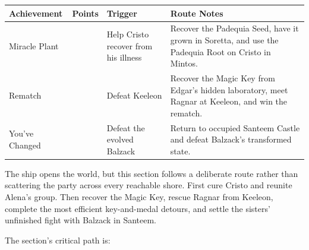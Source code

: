 \documentclass[
  american,
  10pt,
  letterpaper,
  oneside,
  open=any]{scrreprt}
\newcounter{none} %
\newenvironment{guidetable}{%
  \small\setstretch{1.0}%
  \setlength{\tabcolsep}{4pt}%
  \setlength{\LTpre}{8pt}\setlength{\LTpost}{10pt}%
  \renewcommand{\arraystretch}{1.16}%
}{ }
\begin{document}
\begin{guidetable}

{\def\LTcaptype{none} %
\begin{longtable}[]{@{}
  >{\raggedright\arraybackslash}p{}
  >{\raggedleft\arraybackslash}p{}
  >{\raggedright\arraybackslash}p{}
  >{\raggedright\arraybackslash}p{}@{}}
\toprule\noalign{}
\begin{minipage}[b]{\linewidth}\raggedright
\color{GuideGreen}\bfseries Achievement
\end{minipage} & \begin{minipage}[b]{\linewidth}\raggedleft
\color{GuideGreen}\bfseries Points
\end{minipage} & \begin{minipage}[b]{\linewidth}\raggedright
\color{GuideGreen}\bfseries Trigger
\end{minipage} & \begin{minipage}[b]{\linewidth}\raggedright
\color{GuideGreen}\bfseries Route Notes
\end{minipage} \\
\midrule\noalign{}
\endhead
\bottomrule\noalign{}
\endlastfoot
Miracle Plant & 5 & Help Cristo recover from his illness & Recover the
Padequia Seed, have it grown in Soretta, and use the Padequia Root on
Cristo in Mintos. \\
Rematch & 5 & Defeat Keeleon & Recover the Magic Key from Edgar's hidden
laboratory, meet Ragnar at Keeleon, and win the rematch. \\
You've Changed & 5 & Defeat the evolved Balzack & Return to occupied
Santeem Castle and defeat Balzack's transformed state. \\
\end{longtable}
}

\end{guidetable}

The ship opens the world, but this section follows a deliberate route
rather than scattering the party across every reachable shore. First
cure Cristo and reunite Alena's group. Then recover the Magic Key,
rescue Ragnar from Keeleon, complete the most efficient key-and-medal
detours, and settle the sisters' unfinished fight with Balzack in
Santeem.

The section's critical path is:
\end{document}
